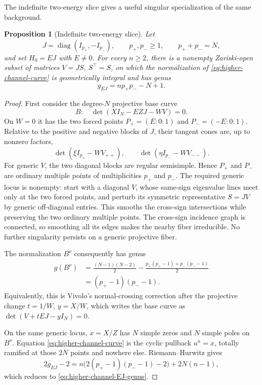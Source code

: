\documentclass[11pt,reqno]{amsart}
\newtheorem{proposition}[theorem]{Proposition}
\theoremstyle{remark}
\newcommand{\diag}{\operatorname{diag}}
\begin{document}
The indefinite two-energy slice gives a useful singular specialization of
the same background.

\begin{proposition}[Indefinite two-energy slice]\label{prop:higher-channel-EJ}
Let
\[
 J=\diag(I_{p_+},-I_{p_-}),\qquad
 p_+,p_-\geq1,\qquad p_++p_-=N,
\]
and set $H_0=EJ$ with $E\ne0$.  For every $n\geq2$, there is a
nonempty Zariski-open subset of matrices $V=JS$, $S^\top=S$, on which
the normalization of \eqref{eq:higher-channel-curve} is geometrically
integral and has genus
\begin{equation}\label{eq:higher-channel-EJ-genus}
 \boxed{g_{EJ}=np_+p_--N+1.}
\end{equation}
\end{proposition}

\begin{proof}
First consider the degree-$N$ projective base curve
\[
 B:\quad \det(XI_N-EZJ-WV)=0.
\]
On $W=0$ it has the two forced points
$P_+=(E:0:1)$ and $P_-=(-E:0:1)$.  Relative to the positive and negative
blocks of $J$, their tangent cones are, up to nonzero factors,
\[
 \det(\xi I_{p_+}-WV_{++}),\qquad
 \det(\eta I_{p_-}-WV_{--}).
\]
For generic $V$, the two diagonal blocks are regular semisimple.  Hence
$P_+$ and $P_-$ are ordinary multiple points of multiplicities $p_+$ and
$p_-$.  The required generic locus is nonempty: start with a diagonal
$V$, whose same-sign eigenvalue lines meet only at the two forced points,
and perturb its symmetric representative $S=JV$ by generic off-diagonal
entries.  This smooths the cross-sign intersections while preserving the
two ordinary multiple points.  The cross-sign incidence graph is connected,
so smoothing all its edges makes the nearby fiber irreducible.  No further
singularity persists on a generic projective fiber.

The normalization $B^\nu$ consequently has genus
\begin{align*}
 g(B^\nu)
 &=\frac{(N-1)(N-2)}2
   -\frac{p_+(p_+-1)+p_-(p_--1)}2 \\
 &=(p_+-1)(p_--1).
\end{align*}
Equivalently, this is Vivolo's normal-crossing correction after the
projective change $t=1/W$, $y=X/W$, which writes the base curve as
$\det(V+tEJ-yI_N)=0$.

On the same generic locus, $x=X/Z$ has $N$ simple zeros and $N$ simple
poles on $B^\nu$.  Equation \eqref{eq:higher-channel-curve} is the
cyclic pullback $u^n=x$, totally ramified at those $2N$ points and nowhere
else.  Riemann--Hurwitz gives
\[
 2g_{EJ}-2
 =n\bigl(2(p_+-1)(p_--1)-2\bigr)+2N(n-1),
\]
which reduces to \eqref{eq:higher-channel-EJ-genus}.
\end{proof}
\end{document}
